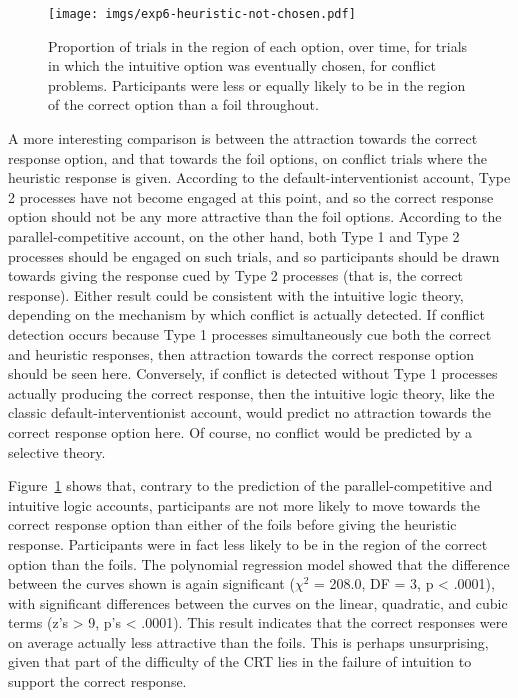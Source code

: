 \begin{figure}[pb]
  \centering
  \texttt{[image: imgs/exp6-heuristic-not-chosen.pdf]}
  \caption[Proportion of cursor in region of other response options
  when heuristic response was given, Experiment 6.]{
    \label{fig:exp6-heuristic-not-chosen}
    Proportion of trials in the region of each option, over time,
    for trials in which the intuitive option was eventually chosen,
    for conflict problems.
    Participants were less or equally likely to be
    in the region of the correct option than a foil throughout.
  }
\end{figure}


A more interesting comparison is between
the attraction towards the correct response option,
and that towards the foil options,
on conflict trials where the heuristic response is given.
According to the default-interventionist account,
Type 2 processes have not become engaged at this point,
and so the correct response option should not be
any more attractive than the foil options.
According to the parallel-competitive account,
on the other hand, both Type 1 and Type 2 processes
should be engaged on such trials,
and so participants should be drawn towards
giving the response cued by Type 2 processes
(that is, the correct response).
Either result could be consistent with the intuitive logic theory,
depending on the mechanism by which conflict is actually detected.
If conflict detection occurs because
Type 1 processes simultaneously cue both the correct and heuristic responses,
then attraction towards the correct response option should be seen here.
Conversely, if conflict is detected
without Type 1 processes actually producing the correct response,
then the intuitive logic theory,
like the classic default-interventionist account,
would predict no attraction towards the correct response option here.
Of course, no conflict would be predicted by a selective theory.

Figure~\ref{fig:exp6-heuristic-not-chosen} shows that,
contrary to the prediction of the parallel-competitive
and intuitive logic accounts,
participants are not more likely to move towards the correct response option
than either of the foils before giving the heuristic response.
Participants were in fact less likely
to be in the region of the correct option than the foils.
The polynomial regression model showed that
the difference between the curves shown is again significant
($\chi^2$ = 208.0, DF = 3, p < .0001),
with significant differences between the curves on the
linear, quadratic, and cubic terms (z's > 9, p's < .0001).
This result indicates that the correct responses were on average
actually less attractive than the foils.
This is perhaps unsurprising,
given that part of the difficulty of the CRT
lies in the failure of intuition to support the correct response.

